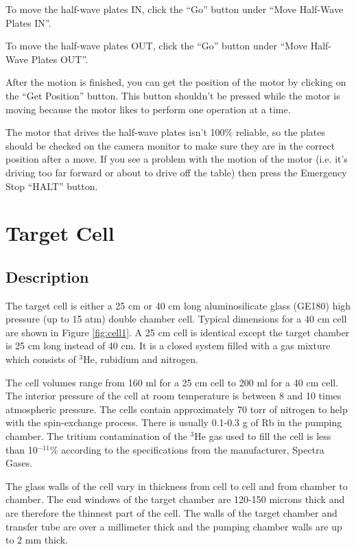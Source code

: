 To move the half-wave plates IN, click the ``Go'' button under
``Move Half-Wave Plates IN''.  

To move the half-wave plates OUT, click the ``Go'' button under
``Move Half-Wave Plates OUT''.

After the motion is finished, you can get the position of the 
motor by clicking on the ``Get Position'' button.  This button
shouldn't be pressed while the motor is moving because the motor
likes to perform one operation at a time.

The motor that drives the half-wave plates isn't 100\% reliable,
so the plates should be checked on the camera monitor to make 
sure they are in the correct position after a move.  If
you see a problem with the motion of the motor (i.e. it's driving too
far forward or about to drive off the table) then press the
Emergency Stop ``HALT'' button.

\section{Target Cell}
\subsection{Description}

The target cell is either a 25 cm or 40 cm long aluminosilicate glass (GE180) high pressure (up to 15 atm) double chamber cell. Typical
dimensions for a 40 cm cell are shown in Figure \ref{fig:cell1}. A 25 cm cell is identical except the target chamber is 25 cm long instead of 40 cm.  It is a closed system filled with a gas mixture which consists of $^3$He, rubidium and
nitrogen. 

The cell volumes range from 160 ml for a 25 cm cell to 200 ml for a 40 cm cell.  The interior pressure of the cell at room temperature is between 8 and 10 times atmospheric pressure.  The cells contain approximately 70 torr of nitrogen to help with the spin-exchange process.  There is usually 0.1-0.3 g of Rb in the pumping chamber.  The tritium contamination of the $^3$He gas used to fill the cell is less than 10$^{-11} \%$ according to the specifications from the manufacturer, Spectra Gases.

The glass walls of the cell vary in thickness from cell to cell and from chamber to chamber.   The end windows of the target chamber are 120-150 microns thick and are therefore the thinnest part of the cell.  The walls of the target chamber and transfer tube are over a millimeter thick and the pumping chamber walls are up to 2 mm thick.   

